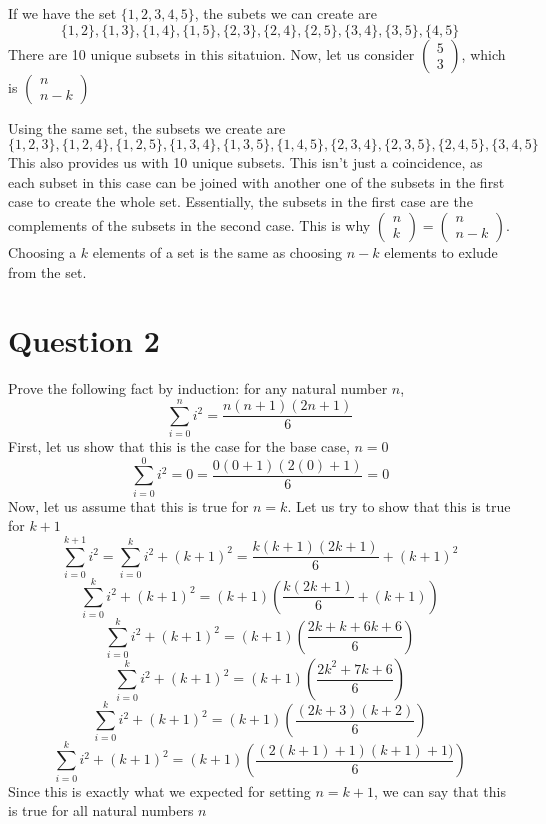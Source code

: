 \documentclass[hidelinks]{article}
\begin{document}
If we have the set $\{1, 2, 3, 4, 5\}$, the subets we can create are 
\[
    \{1, 2\}, \{1, 3\}, \{1, 4\}, \{1, 5\}, \{2, 3\}, \{2, 4\}, \{2, 5\}, \{3, 4\}, \{3, 5\}, \{4, 5\}
\]
There are 10 unique subsets in this sitatuion. Now, let us consider $\begin{pmatrix} 5\\ 3 \end{pmatrix}$, which is $\begin{pmatrix} n \\ n-k \end{pmatrix}$

Using the same set, the subsets we create are 
\[
    \{1, 2, 3\}, \{1, 2, 4\}, \{1, 2, 5\}, \{1, 3, 4\}, \{1, 3, 5\}, \{1, 4, 5\}, \{2, 3, 4\}, \{2, 3, 5\}, \{2, 4, 5\}, \{3, 4, 5\}
\]
This also provides us with 10 unique subsets. This isn't just a coincidence, as each subset in this case can be joined with another one of the subsets in the first case to create the whole set. Essentially, the subsets in the first case are the complements of the subsets in the second case. This is why $\begin{pmatrix}n \\ k \end{pmatrix} = \begin{pmatrix}n \\ n-k \end{pmatrix}$. Choosing a $k$ elements of a set is the same as choosing $n - k$ elements to exlude from the set.
\newpage
\section*{Question 2}
Prove the following fact by induction: for any natural number $n$, 
\[
    \sum_{i=0}^{n} i^2 = \frac{n(n+1)(2n+1)}{6}
\]
First, let us show that this is the case for the base case, $n = 0$
\[
    \sum_{i=0}^{0} i^2 = 0 = \frac{0(0+1)(2(0)+1)}{6} = 0
\]
Now, let us assume that this is true for $n = k$. Let us try to show that this is true for $k+1$ 
\[ 
    \sum_{i=0}^{k+1} i^2  = \sum_{i=0}^{k} i^2 + (k+1)^2 = \frac{k(k+1)(2k+1)}{6} + (k+1)^2
\]
\[
    \sum_{i=0}^{k} i^2 + (k+1)^2  = (k+1)\left (\frac{k(2k+1)}{6} + (k+1)\right)
\]
\[
    \sum_{i=0}^{k} i^2 + (k+1)^2  = (k+1)\left (\frac{2k+k+6k+6}{6} \right)
\]
\[
    \sum_{i=0}^{k} i^2 + (k+1)^2  = (k+1)\left (\frac{2k^2+7k+6}{6} \right)
\]
\[
    \sum_{i=0}^{k} i^2 + (k+1)^2  = (k+1)\left (\frac{(2k+3)(k+2)}{6} \right)
\]
\[
    \sum_{i=0}^{k} i^2 + (k+1)^2  = (k+1)\left (\frac{(2(k+1) + 1)(k+1) + 1)}{6} \right)
\]
Since this is exactly what we expected for setting $n=k+1$, we can say that this is true for all natural numbers $n$
\newpage
\end{document}
